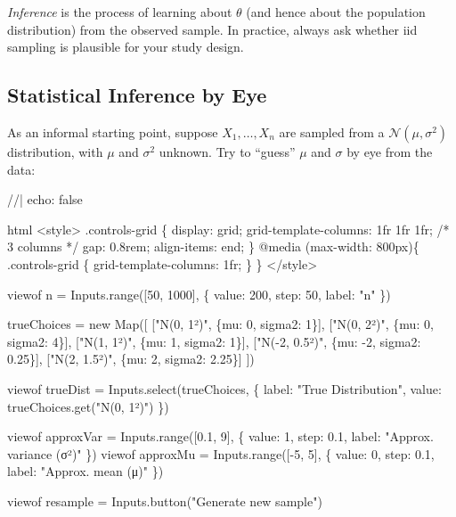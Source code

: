 \documentclass[
  letterpaper,
  DIV=11,
  numbers=noendperiod]{scrreprt}
\newenvironment{Shaded}{\begin{snugshade}}{\end{snugshade}}
\newcommand{\NormalTok}[1]{\textcolor[rgb]{0.00,0.23,0.31}{#1}}
\theoremstyle{definition}
\theoremstyle{plain}
\theoremstyle{definition}
\theoremstyle{remark}
\begin{document}
\emph{Inference} is the process of learning about \(\theta\) (and hence
about the population distribution) from the observed sample. In
practice, always ask whether iid sampling is plausible for your study
design.

\subsection{Statistical Inference by Eye}\label{sec-inference-eye}

As an informal starting point, suppose \(X_1,\ldots,X_n\) are sampled
from a \(\mathcal{N}(\mu,\sigma^2)\) distribution, with \(\mu\) and
\(\sigma^2\) unknown. Try to ``guess'' \(\mu\) and \(\sigma\) by eye
from the data:

\begin{Shaded}
\begin{Highlighting}[]
\NormalTok{//| echo: false}

\NormalTok{html\textasciigrave{}}
\NormalTok{\textless{}style\textgreater{}}
\NormalTok{.controls{-}grid \{}
\NormalTok{  display: grid;}
\NormalTok{  grid{-}template{-}columns: 1fr 1fr 1fr;   /* 3 columns */}
\NormalTok{  gap: 0.8rem;}
\NormalTok{  align{-}items: end;}
\NormalTok{\}}
\NormalTok{@media (max{-}width: 800px)\{}
\NormalTok{  .controls{-}grid \{ grid{-}template{-}columns: 1fr; \}}
\NormalTok{\}}
\NormalTok{\textless{}/style\textgreater{}}
\NormalTok{\textasciigrave{}}

\NormalTok{viewof n = Inputs.range([50, 1000], \{ value: 200, step: 50, label: "n" \})}

\NormalTok{trueChoices = new Map([}
\NormalTok{  ["N(0, 1²)",    \{mu: 0,  sigma2: 1\}],}
\NormalTok{  ["N(0, 2²)",    \{mu: 0,  sigma2: 4\}],}
\NormalTok{  ["N(1, 1²)",    \{mu: 1,  sigma2: 1\}],}
\NormalTok{  ["N({-}2, 0.5²)", \{mu: {-}2, sigma2: 0.25\}],}
\NormalTok{  ["N(2, 1.5²)",  \{mu: 2,  sigma2: 2.25\}]}
\NormalTok{])}

\NormalTok{viewof trueDist = Inputs.select(trueChoices, \{}
\NormalTok{  label: "True Distribution",}
\NormalTok{  value: trueChoices.get("N(0, 1²)")}
\NormalTok{\})}

\NormalTok{viewof approxVar = Inputs.range([0.1, 9], \{ value: 1, step: 0.1, label: "Approx. variance (σ²)" \})}
\NormalTok{viewof approxMu  = Inputs.range([{-}5, 5], \{ value: 0, step: 0.1, label: "Approx. mean (μ)" \})}

\NormalTok{viewof resample = Inputs.button("Generate new sample")}
\end{Highlighting}
\end{Shaded}
\end{document}
